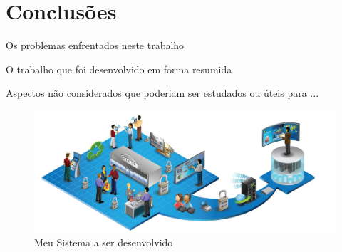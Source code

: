 


\chapter{Conclus\~{o}es}


Os problemas enfrentados neste trabalho


O trabalho que foi desenvolvido em forma resumida

Aspectos n\~{a}o considerados que poderiam ser estudados ou \'{u}teis para ...



   \begin{figure}[H]
    \begin{center}
        \includegraphics[width=12cm]{MeuSistema.jpg}
        \caption{Meu Sistema a ser desenvolvido} \label{sistema}
    \end{center}
   \end{figure} 